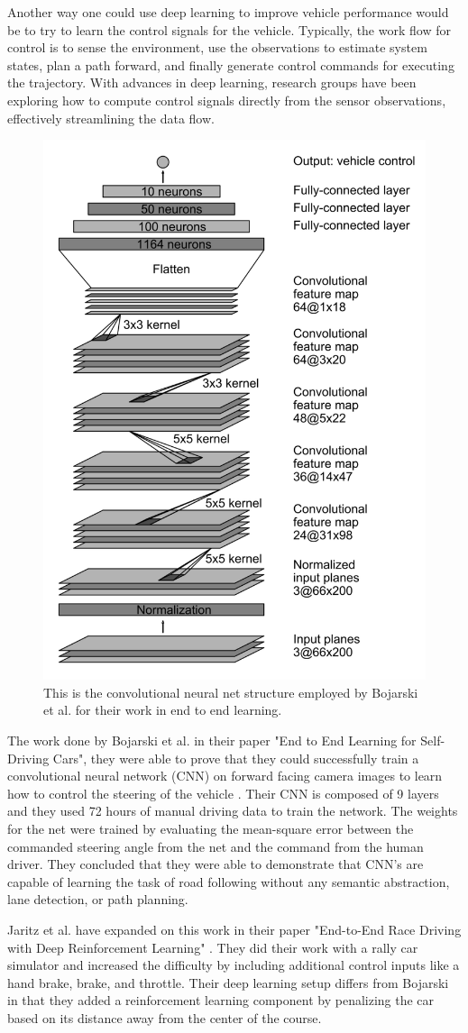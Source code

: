 \documentclass[letterpaper, 10 pt, conference]{ieeeconf}  %
\begin{document}
Another way one could use deep learning to improve vehicle performance would be to try to learn the control signals for the vehicle. Typically, the work flow for control is to sense the environment, use the observations to estimate system states, plan a path forward, and finally generate control commands for executing the trajectory. With advances in deep learning, research groups have been exploring how to compute control signals directly from the sensor observations, effectively streamlining the data flow.

\begin{figure}[h!]
\begin{center}
\includegraphics[width=.45\textwidth]{Figures/conv_net.png}
\caption{This is the convolutional neural net structure employed by Bojarski et al. for their work in end to end learning. }
\label{conv_net}
\end{center}
\end{figure}

The work done by Bojarski et al. in their paper "End to End Learning for Self-Driving Cars", they were able to prove that they could successfully train a convolutional neural network (CNN) on forward facing camera images to learn how to control the steering of the vehicle \cite{bojarski}. Their CNN is composed of 9 layers and they used 72 hours of manual driving data to train the network. The weights for the net were trained by evaluating the mean-square error between the commanded steering angle from the net and the command from the human driver. They concluded that they were able to demonstrate that CNN's are capable of learning the task of road following without any semantic abstraction, lane detection, or path planning. 

Jaritz et al. have expanded on this work in their paper "End-to-End Race Driving with Deep Reinforcement Learning" \cite{jaritz}. They did their work with a rally car simulator and increased the difficulty by including additional control inputs like a hand brake, brake, and throttle. Their deep learning setup differs from Bojarski in that they added a reinforcement learning component by penalizing the car based on its distance away from the center of the course.
\end{document}
